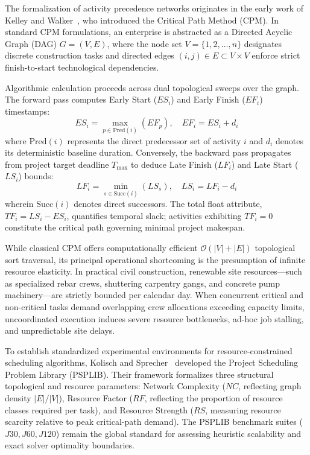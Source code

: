 \documentclass[conference]{IEEEtran}
\begin{document}
The formalization of activity precedence networks originates in the early work of Kelley and Walker~\cite{kelley1959critical}, who introduced the Critical Path Method (CPM). In standard CPM formulations, an enterprise is abstracted as a Directed Acyclic Graph (DAG) $G = (V, E)$, where the node set $V = \{1, 2, \dots, n\}$ designates discrete construction tasks and directed edges $(i, j) \in E \subset V \times V$ enforce strict finish-to-start technological dependencies.

Algorithmic calculation proceeds across dual topological sweeps over the graph. The forward pass computes Early Start ($ES_i$) and Early Finish ($EF_i$) timestamps:
\begin{equation}
ES_i = \max_{p \in \text{Pred}(i)} (EF_p), \quad EF_i = ES_i + d_i
\end{equation}
where $\text{Pred}(i)$ represents the direct predecessor set of activity $i$ and $d_i$ denotes its deterministic baseline duration. Conversely, the backward pass propagates from project target deadline $T_{\text{max}}$ to deduce Late Finish ($LF_i$) and Late Start ($LS_i$) bounds:
\begin{equation}
LF_i = \min_{s \in \text{Succ}(i)} (LS_s), \quad LS_i = LF_i - d_i
\end{equation}
wherein $\text{Succ}(i)$ denotes direct successors. The total float attribute, $TF_i = LS_i - ES_i$, quantifies temporal slack; activities exhibiting $TF_i = 0$ constitute the critical path governing minimal project makespan.

While classical CPM offers computationally efficient $\mathcal{O}(|V| + |E|)$ topological sort traversal, its principal operational shortcoming is the presumption of infinite resource elasticity. In practical civil construction, renewable site resources---such as specialized rebar crews, shuttering carpentry gangs, and concrete pump machinery---are strictly bounded per calendar day. When concurrent critical and non-critical tasks demand overlapping crew allocations exceeding capacity limits, uncoordinated execution induces severe resource bottlenecks, ad-hoc job stalling, and unpredictable site delays.

To establish standardized experimental environments for resource-constrained scheduling algorithms, Kolisch and Sprecher~\cite{kolisch1996psplib} developed the Project Scheduling Problem Library (PSPLIB). Their framework formalizes three structural topological and resource parameters: Network Complexity ($NC$, reflecting graph density $|E|/|V|$), Resource Factor ($RF$, reflecting the proportion of resource classes required per task), and Resource Strength ($RS$, measuring resource scarcity relative to peak critical-path demand). The PSPLIB benchmark suites ($J30, J60, J120$) remain the global standard for assessing heuristic scalability and exact solver optimality boundaries.
\end{document}

